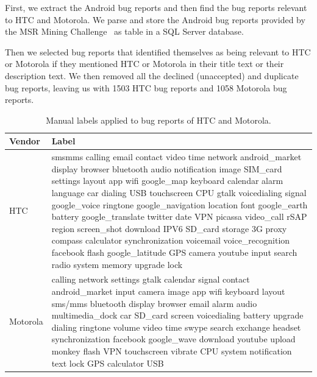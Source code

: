 \documentclass[10pt, conference, compsocconf]{IEEEtran}
\begin{document}

First, we
extract the Android bug reports and then find
the bug reports relevant to HTC and Motorola.  We parse and store the
Android bug reports provided by the MSR Mining
Challenge~\cite{MSRChallenge2012} as table in a SQL Server database.


Then we selected bug reports that identified themselves as being
relevant to HTC or Motorola if they mentioned HTC or Motorola in their
title text or their description text.
We then removed all the declined (unaccepted) and duplicate bug reports, leaving us
with 1503 HTC bug reports and 1058 Motorola bug reports.

\begin{table}[!t]
\caption{Manual labels applied to bug reports of HTC and Motorola.}
\label{selected1}
\centering
\begin{tabular}{|m{1.3cm}<{\centering}|m{}<{\centering}|}
\hline
Vendor & Label\\
\hline
HTC & sms\/mms calling email contact video time network
    android\_market display browser bluetooth audio 
    notification image SIM\_card settings layout app 
    wifi google\_map keyboard calendar alarm language car 
    dialing USB touchscreen CPU gtalk voicedialing signal 
    google\_voice ringtone google\_navigation location font 
    google\_earth battery google\_translate twitter date VPN 
    picassa video\_call rSAP region screen\_shot download 
    IPV6 SD\_card storage 3G proxy compass calculator 
    synchronization  voicemail  voice\_recognition facebook flash 
    google\_latitude GPS camera youtube input search radio 
    system memory  upgrade  lock \\
\hline
Motorola & calling network settings gtalk calendar signal contact
      android\_market input camera image app wifi keyboard
      layout sms\//mms bluetooth display browser email
  alarm audio multimedia\_dock car SD\_card screen
  voicedialing battery upgrade dialing ringtone volume
  video time swype search exchange headset synchronization
  facebook google\_wave download youtube upload
  monkey flash VPN touchscreen vibrate CPU system
  notification text lock GPS calculator  USB\\
\hline
\end{tabular}
\end{table}
\end{document}
